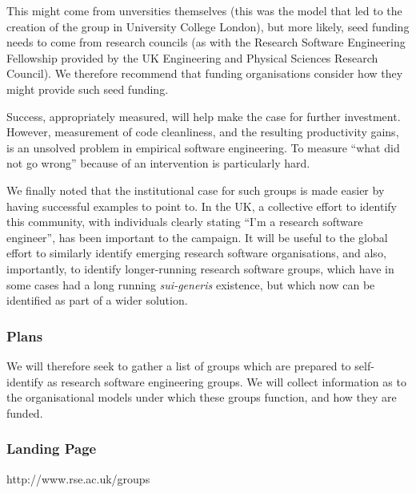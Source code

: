 This might come from unversities themselves (this was the model that led to the
creation of the group in University College London), but more likely, seed
funding needs to come from research councils (as with the Research Software
Engineering Fellowship provided by the UK Engineering and Physical Sciences
Research Council). We therefore recommend that funding organisations consider
how they might provide such seed funding.

Success, appropriately measured, will help make the case for further investment.
However, measurement of code cleanliness, and the resulting productivity gains,
is an unsolved problem in empirical software engineering. To measure
``what did not go wrong'' because of an intervention is particularly hard.

We finally noted that the institutional case for such groups is made easier
by having successful examples to point to. In the UK, a collective effort to
identify this community, with individuals clearly stating ``I'm a research
software engineer'', has been important to the campaign. It will be useful to
the global effort to similarly identify emerging research software organisations,
and also, importantly, to identify longer-running research software groups,
which have in some cases had a long running \emph{sui-generis} existence, but which
now can be identified as part of a wider solution.

\subsubsection{Plans}

We will therefore seek to gather a list of groups which are prepared to
self-identify as research software engineering groups. We will collect information
as to the organisational models under which these groups function, and how they
are funded.

\subsubsection{Landing Page}

http://www.rse.ac.uk/groups
